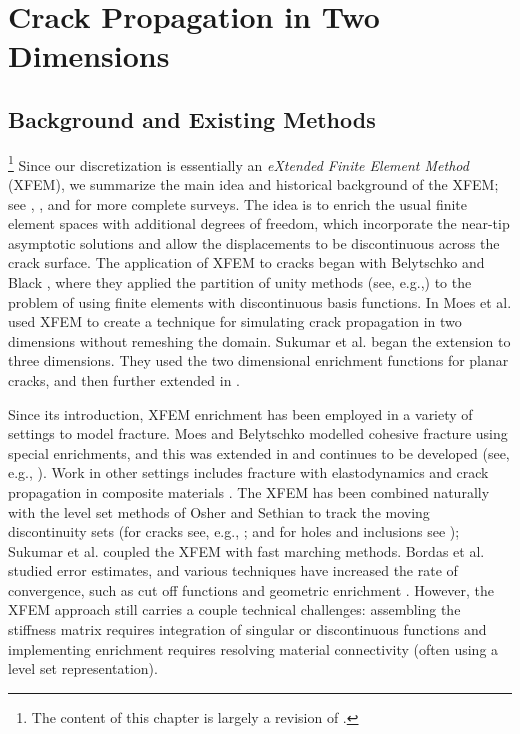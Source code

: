 %

\chapter{Crack Propagation in Two Dimensions} \label{chap:partI.crackpropagation}

\section{Background and Existing Methods}

\footnote{The content of this chapter is largely a revision of \cite{Richardson11}.}
Since our discretization is essentially an \emph{eXtended Finite Element Method} (XFEM), we summarize the main idea and historical background of the XFEM; see \cite{Belytschko09}, \cite{Karihaloo03}, and \cite{Abdelaziz08} for more complete surveys. The idea is to enrich the usual finite element spaces with additional degrees of freedom, which incorporate the near-tip asymptotic solutions and allow the displacements to be discontinuous across the crack surface. The application of XFEM to cracks began with Belytschko and Black \cite{Belytschko99}, where they applied the partition of unity methods (see, e.g.,\cite{Melenk96}) to the problem of using finite elements with discontinuous basis functions. In \cite{Moes99} Moes et al. used XFEM to create a technique for simulating crack propagation in two dimensions without remeshing the domain. Sukumar et al. \cite{Sukumar00} began the extension to three dimensions. They used the two dimensional enrichment functions for planar cracks, and then further extended in \cite{Areias05}.

Since its introduction, XFEM enrichment has been employed in a variety of settings to model fracture. Moes and Belytschko \cite{Moes02b} modelled cohesive fracture using special enrichments, and this was extended in \cite{Zi.Goangseup03} and continues to be developed (see, e.g., \cite{Mariani03, Borst04, Asferg07}). Work in other settings includes fracture with elastodynamics \cite{Belytschko04} and crack propagation in composite materials \cite{Huynh09}. The XFEM has been combined naturally with the level set methods of Osher and Sethian \cite{Osher88, Osher04} to track the moving discontinuity sets (for cracks see, e.g., \cite{Belytschko01, Moes02a, Gravouil02, Duflot07, Prabel07}; and for holes and inclusions see \cite{Sukumar01}); Sukumar et al. \cite{Sukumar08} coupled the XFEM with fast marching methods. Bordas et al. \cite{Bordas07} studied error estimates, and various techniques have increased the rate of convergence, such as cut off functions and geometric enrichment \cite{Chahine06, Chahine08, Shen09}. However, the XFEM approach still carries a couple technical challenges: assembling the stiffness matrix requires integration of singular or discontinuous functions and implementing enrichment requires resolving material connectivity (often using a level set representation).

